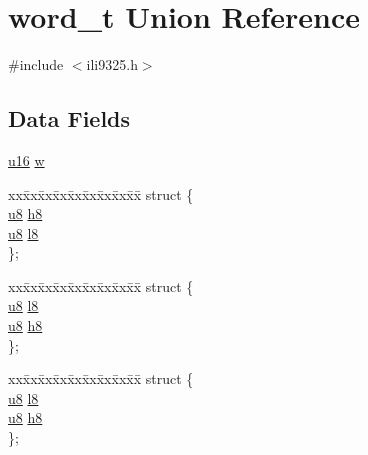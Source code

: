 \hypertarget{unionword__t}{\section{word\-\_\-t Union Reference}
\label{unionword__t}
}


{\ttfamily \#include $<$ili9325.\-h$>$}

\subsection*{Data Fields}
\begin{DoxyCompactItemize}
\item 
\hyperlink{p8_2pinguino_2core_2typedef_8h_a50b0d1c7a54fa09a64a3ac111c778520}{u16} \hyperlink{unionword__t_afba0181b8edd2f6d8219d7042ffc8a35}{w}
\item 
\begin{tabbing}
xx\=xx\=xx\=xx\=xx\=xx\=xx\=xx\=xx\=\kill
struct \{\\
\>\hyperlink{p8_2pinguino_2core_2typedef_8h_aed742c436da53c1080638ce6ef7d13de}{u8} \hyperlink{unionword__t_adcad4dc69be4c39d2fb6307f0cb97ac1}{h8}\\
\>\hyperlink{p8_2pinguino_2core_2typedef_8h_aed742c436da53c1080638ce6ef7d13de}{u8} \hyperlink{unionword__t_a533455d8a4ec318e7144be4c1b6b9af3}{l8}\\
\}; \\

\end{tabbing}\item 
\begin{tabbing}
xx\=xx\=xx\=xx\=xx\=xx\=xx\=xx\=xx\=\kill
struct \{\\
\>\hyperlink{p8_2pinguino_2core_2typedef_8h_aed742c436da53c1080638ce6ef7d13de}{u8} \hyperlink{unionword__t_a533455d8a4ec318e7144be4c1b6b9af3}{l8}\\
\>\hyperlink{p8_2pinguino_2core_2typedef_8h_aed742c436da53c1080638ce6ef7d13de}{u8} \hyperlink{unionword__t_adcad4dc69be4c39d2fb6307f0cb97ac1}{h8}\\
\}; \\

\end{tabbing}\item 
\begin{tabbing}
xx\=xx\=xx\=xx\=xx\=xx\=xx\=xx\=xx\=\kill
struct \{\\
\>\hyperlink{p8_2pinguino_2core_2typedef_8h_aed742c436da53c1080638ce6ef7d13de}{u8} \hyperlink{unionword__t_a533455d8a4ec318e7144be4c1b6b9af3}{l8}\\
\>\hyperlink{p8_2pinguino_2core_2typedef_8h_aed742c436da53c1080638ce6ef7d13de}{u8} \hyperlink{unionword__t_adcad4dc69be4c39d2fb6307f0cb97ac1}{h8}\\
\}; \\


\end{tabbing}
\end{DoxyCompactItemize}
